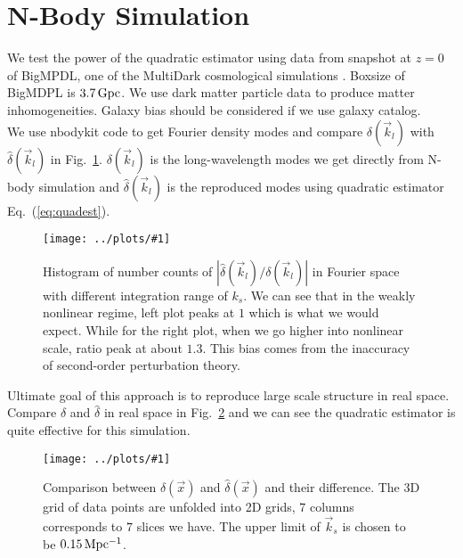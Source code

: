 \documentclass[prd,amsmath,amssymb,floatfix,superscriptaddress,nofootinbib,twocolumn]{revtex4-1}
\newcommand{\vk}{\vec{k}}
\newcommand{\ec}[1]{Eq.~(\ref{eq:#1})}
\newcommand{\rf}[1]{\ref{fig:#1}}
\newcommand{\sfig}[2]{
\texttt{[image: ../plots/\#1]}
        }
\newcommand{\sfigg}[2]{
\texttt{[image: ../plots/\#1]}
        }
\newcommand{\Sfig}[2]{
   \begin{figure}[thbp]
   \begin{center}
    \sfig{../plots/#1.pdf}{\columnwidth}
    \caption{{\small #2}}
    \label{fig:#1}
     \end{center}
   \end{figure}
}
\newcommand{\Sfigg}[2]{
   \begin{figure}[thbp]
    \sfigg{../plots/#1.pdf}{\columnwidth}
    \caption{{\small #2}}
    \label{fig:#1}
   \end{figure}
}
\begin{document}
\section{N-Body Simulation}\label{sec3}
We test the power of the quadratic estimator using data from snapshot at $z=0$ of BigMPDL, one of the MultiDark cosmological simulations \cite{Klypin:2014nov}. Boxsize of BigMDPL is $3.7\,\rm Gpc$. We use dark matter particle data to produce matter inhomogeneities. Galaxy bias should be considered if we use galaxy catalog.\\
We use nbodykit code to get Fourier density modes \cite{Hand:2018nby} and compare $\delta(\vk_l)$ with $\hat{\delta}(\vk_l)$ in Fig.~\rf{hist}. $\delta(\vk_l)$ is the long-wavelength modes we get directly from N-body simulation and $\hat{\delta}(\vk_l)$ is the reproduced modes using quadratic estimator \ec{quadest}.\\
\Sfig{hist}{Histogram of number counts of $|\hat{\delta}(\vk_l)/\delta(\vk_l)|$ in Fourier space with different integration range of $k_s$. We can see that in the weakly nonlinear regime, left plot peaks at $1$ which is what we would expect. While for the right plot, when we go higher into nonlinear scale, ratio peak at about $1.3$. This bias comes from the inaccuracy of second-order perturbation theory.}

Ultimate goal of this approach is to reproduce large scale structure in real space. Compare $\delta$ and $\hat{\delta}$ in real space in Fig.~\rf{real} and we can see the quadratic estimator is quite effective for this simulation.
\Sfigg{real}{Comparison between $\delta(\vec{x})$ and $\hat{\delta}(\vec{x})$ and their difference. The 3D grid of data points are unfolded into 2D grids, $7$ columns corresponds to $7$ slices we have. The upper limit of $\vk_s$ is chosen to be $0.15 \, \rm Mpc^{-1}$.}
\end{document}
